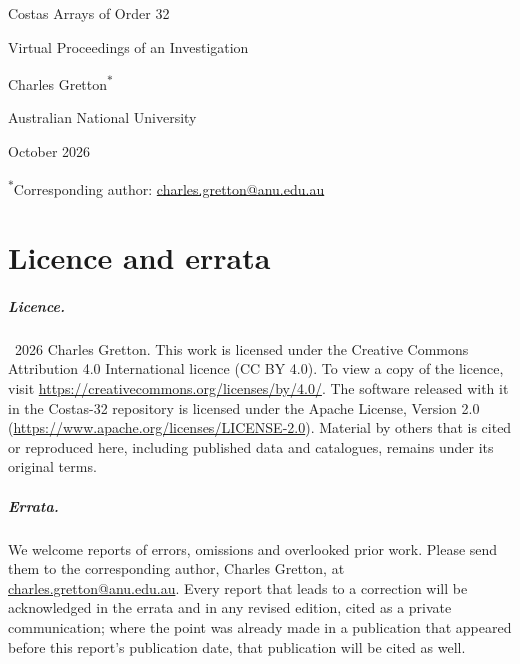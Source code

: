 \documentclass[11pt,a4paper,oneside]{report}
\theoremstyle{definition}
\begin{document}
\begin{titlepage}
\centering
\vspace*{3cm}
{\LARGE Costas Arrays of Order 32\par}
\vspace{0.6cm}
{\Large Virtual Proceedings of an Investigation\par}
\vspace{2cm}
{\large Charles Gretton\textsuperscript{$\ast$}\par}
{\normalsize Australian National University\par}
\vspace{1cm}
{\normalsize October 2026\par}
\vfill
{\small\textsuperscript{$\ast$}Corresponding author:
\href{mailto:charles.gretton@anu.edu.au}{charles.gretton@anu.edu.au}\par}
\end{titlepage}

\chapter*{Licence and errata}

\paragraph{Licence.} \textcopyright\ 2026 Charles Gretton. This work is licensed under the Creative Commons Attribution 4.0 International licence (CC BY 4.0).
To view a copy of the licence, visit \url{https://creativecommons.org/licenses/by/4.0/}. The software released
with it in the Costas-32 repository is licensed under the Apache License, Version 2.0
(\url{https://www.apache.org/licenses/LICENSE-2.0}). Material by others that is cited or reproduced here,
including published data and catalogues, remains under its original terms.

\paragraph{Errata.} We welcome reports of errors, omissions and overlooked prior work. Please send them to the
corresponding author, Charles Gretton, at \href{mailto:charles.gretton@anu.edu.au}{charles.gretton@anu.edu.au}.
Every report that leads to a correction will be acknowledged in the errata and in any revised edition,
cited as a private communication; where the point was already made in a publication that appeared before
this report's publication date, that publication will be cited as well.
\end{document}
